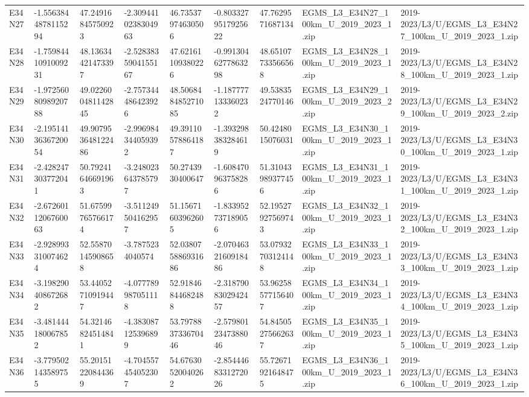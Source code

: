\begin{landscape}
\begin{longtable}{lllllllll}
E34N27 & -1.5563844878115294 & 47.24916845750923 & -2.3094410238304963 & 46.73537974630506 & -0.8033279517925622 & 47.7629571687134 & EGMS\_L3\_E34N27\_100km\_U\_2019\_2023\_1.zip & 2019-2023/L3/U/EGMS\_L3\_E34N27\_100km\_U\_2019\_2023\_1.zip \\
E34N28 & -1.7598441091009231 & 48.13634421473397 & -2.5283835904155167 & 47.62161109380226 & -0.9913046277863298 & 48.65107733566568 & EGMS\_L3\_E34N28\_100km\_U\_2019\_2023\_1.zip & 2019-2023/L3/U/EGMS\_L3\_E34N28\_100km\_U\_2019\_2023\_1.zip \\
E34N29 & -1.9725608098920788 & 49.022600481142845 & -2.757344486423926 & 48.506848485271085 & -1.187777133360232 & 49.5383524770146 & EGMS\_L3\_E34N29\_100km\_U\_2019\_2023\_2.zip & 2019-2023/L3/U/EGMS\_L3\_E34N29\_100km\_U\_2019\_2023\_2.zip \\
E34N30 & -2.1951413636720054 & 49.907953648122486 & -2.996984344059392 & 49.39110578864187 & -1.393298383284619 & 50.4248015076031 & EGMS\_L3\_E34N30\_100km\_U\_2019\_2023\_1.zip & 2019-2023/L3/U/EGMS\_L3\_E34N30\_100km\_U\_2019\_2023\_1.zip \\
E34N31 & -2.428247303772041 & 50.79241646691963 & -3.248023643785797 & 50.2743930400647 & -1.608470963758286 & 51.31043989377456 & EGMS\_L3\_E34N31\_100km\_U\_2019\_2023\_1.zip & 2019-2023/L3/U/EGMS\_L3\_E34N31\_100km\_U\_2019\_2023\_1.zip \\
E34N32 & -2.6726011206760063 & 51.67599765766174 & -3.511249504162957 & 51.15671603962605 & -1.833952737189056 & 52.19527927569743 & EGMS\_L3\_E34N32\_100km\_U\_2019\_2023\_1.zip & 2019-2023/L3/U/EGMS\_L3\_E34N32\_100km\_U\_2019\_2023\_1.zip \\
E34N33 & -2.928993310074624 & 52.55870145908658 & -3.7875234040574 & 52.038075886931686 & -2.0704632160918486 & 53.07932703124148 & EGMS\_L3\_E34N33\_100km\_U\_2019\_2023\_1.zip & 2019-2023/L3/U/EGMS\_L3\_E34N33\_100km\_U\_2019\_2023\_1.zip \\
E34N34 & -3.198290408672682 & 53.44052710919447 & -4.077789987051118 & 52.91846844682488 & -2.3187908302942457 & 53.96258577156407 & EGMS\_L3\_E34N34\_100km\_U\_2019\_2023\_1.zip & 2019-2023/L3/U/EGMS\_L3\_E34N34\_100km\_U\_2019\_2023\_1.zip \\
E34N35 & -3.481444180067852 & 54.32146824514841 & -4.383087125396899 & 53.797883733670446 & -2.5798012347388046 & 54.84505275662637 & EGMS\_L3\_E34N35\_100km\_U\_2019\_2023\_1.zip & 2019-2023/L3/U/EGMS\_L3\_E34N35\_100km\_U\_2019\_2023\_1.zip \\
E34N36 & -3.779502143589755 & 55.20151220844369 & -4.704557454052307 & 54.67630520040262 & -2.8544468331272026 & 55.72671921648475 & EGMS\_L3\_E34N36\_100km\_U\_2019\_2023\_1.zip & 2019-2023/L3/U/EGMS\_L3\_E34N36\_100km\_U\_2019\_2023\_1.zip \\

\end{longtable}
\end{landscape}
